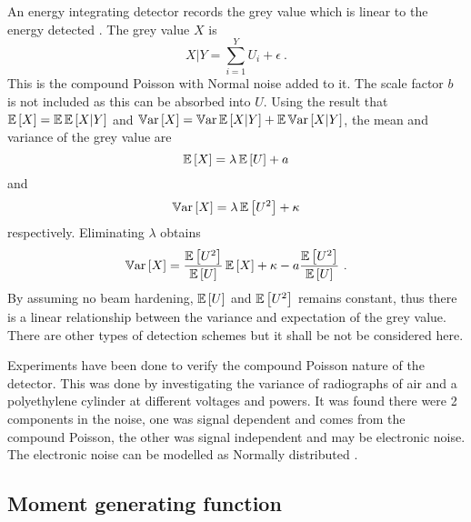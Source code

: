 An energy integrating detector records the grey value which is linear to the energy detected \citep{whiting2006properties}. The grey value $X$ is
\begin{equation}
X|Y = \sum_{i=1}^Y U_i + \epsilon \ .
\end{equation}
This is the compound Poisson with Normal noise added to it. The scale factor $b$ is not included as this can be absorbed into $U$. Using the result that $\operatorname{\mathbb{E}}\left[X\right]=\operatorname{\mathbb{E}}\operatorname{\mathbb{E}}\left[X|Y\right]$ and $\operatorname{\mathbb{V}ar}\left[X\right] = \operatorname{\mathbb{V}ar}\operatorname{\mathbb{E}}\left[X|Y\right] + \operatorname{\mathbb{E}}\operatorname{\mathbb{V}ar}\left[X|Y\right]$, the mean and variance of the grey value are
\begin{equation}
\operatorname{\mathbb{E}}\left[X\right] = \lambda\operatorname{\mathbb{E}}\left[U\right]+a
\end{equation}
and
\begin{equation}
\operatorname{\mathbb{V}ar}\left[X\right] = \lambda \operatorname{\mathbb{E}}\left[U^2\right]+\kappa
\end{equation}
respectively. Eliminating $\lambda$ obtains
\begin{equation}
\variance\left[X\right] = \dfrac{\expectation\left[U^2\right]}{\expectation\left[U\right]} \expectation\left[X\right] + \kappa - a\dfrac{\expectation\left[U^2\right]}{\expectation\left[U\right]} \ .
\end{equation}
By assuming no beam hardening, $\operatorname{\mathbb{E}}\left[U\right]$ and $\operatorname{\mathbb{E}}\left[U^2\right]$ remains constant, thus there is a linear relationship between the variance and expectation of the grey value. There are other types of detection schemes \citep{whiting2006properties} but it shall be not be considered here.

Experiments have been done to verify the compound Poisson nature of the detector. This was done by investigating the variance of radiographs of air \citep{hsieh2015compound} and a polyethylene cylinder \citep{yang2009evaluation} \citep{yang2010noise} at different voltages and powers. It was found there were 2 components in the noise, one was signal dependent and comes from the compound Poisson, the other was signal independent and may be electronic noise. The electronic noise can be modelled as Normally distributed \citep{xu2009electronic}.

\subsection{Moment generating function}


